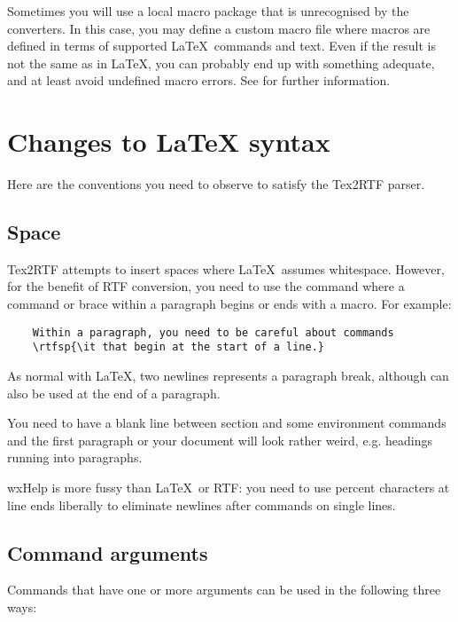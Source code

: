 Sometimes you will use a local macro package that is unrecognised by
the converters. In this case, you may define a custom macro file
where macros are defined in terms of supported \LaTeX\ commands
and text. Even if the result is not the same as in \LaTeX, you
can probably end up with something adequate, and at least avoid
undefined macro errors. See  for
further information.

\section{Changes to LaTeX syntax}

Here are the conventions you need to observe to satisfy the Tex2RTF
parser.

\subsection{Space}\label{space}%

Tex2RTF attempts to insert spaces where \LaTeX\ assumes whitespace.
However, for the benefit of RTF conversion, you need to use the  command
where a command or brace within a paragraph begins or ends with a macro. For example:

\begin{verbatim}
    Within a paragraph, you need to be careful about commands
    \rtfsp{\it that begin at the start of a line.}
\end{verbatim}

As normal with \LaTeX, two newlines represents a paragraph break,
although  can also be used at the end of a paragraph.

You need to have a blank line between section and some environment
commands and the first paragraph or your document will look rather
weird, e.g. headings running into paragraphs.

wxHelp is more fussy than \LaTeX\ or RTF: you need to use percent
characters at line ends liberally to eliminate newlines after commands
on single lines.

\subsection{Command arguments}%

Commands that have one or more arguments can be used in the following
three ways:

